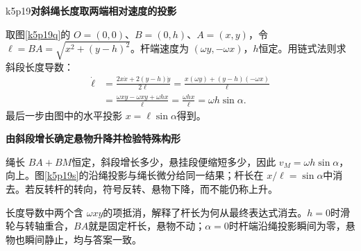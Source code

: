 \begin{drillsolution}{k5p19}\textbf{对斜绳长度取两端相对速度的投影}\par\nobreak
取图\ref{k5p19q}的 $O=(0,0)$、$B=(0,h)$、$A=(x,y)$，令 $\ell=BA=\sqrt{x^2+(y-h)^2}$。杆端速度为 $(\omega y,-\omega x)$，$h$恒定。用链式法则求斜段长度导数：
\begin{align*}
 \dot\ell&=\frac{2x\dot x+2(y-h)\dot y}{2\ell}
 =\frac{x(\omega y)+(y-h)(-\omega x)}\ell\\
 &=\frac{\omega xy-\omega xy+\omega hx}{\ell}
 =\frac{\omega hx}{\ell}=\omega h\sin\alpha.
\end{align*}
最后一步由图中的水平投影 $x=\ell\sin\alpha$得到。


\par\medskip{}\noindent\textbf{由斜段增长确定悬物升降并检验特殊构形}\par\nobreak
绳长 $BA+BM$恒定，斜段增长多少，悬挂段便缩短多少，因此 $\boxed{v_M=\omega h\sin\alpha}$，向上。图\ref{k5p19s}的沿绳投影与绳长微分给同一结果；杆长在 $x/\ell=\sin\alpha$中消去。若反转杆的转向，符号反转、悬物下降，而不能仍称上升。

长度导数中两个含 $\omega xy$的项抵消，解释了杆长为何从最终表达式消去。$h=0$时滑轮与转轴重合，$BA$就是固定杆长，悬物不动；$\alpha=0$时杆端沿绳投影瞬间为零，悬物也瞬间静止，均与答案一致。\end{drillsolution}

